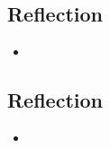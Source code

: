 \documentclass[emulatestandardclasses]{scrartcl}
\begin{document}
\subsection{Reflection}

\begin{itemize}
  \item 
\end{itemize}

\subsection{Reflection}

\begin{itemize}
  \item 
\end{itemize}
\end{document}
